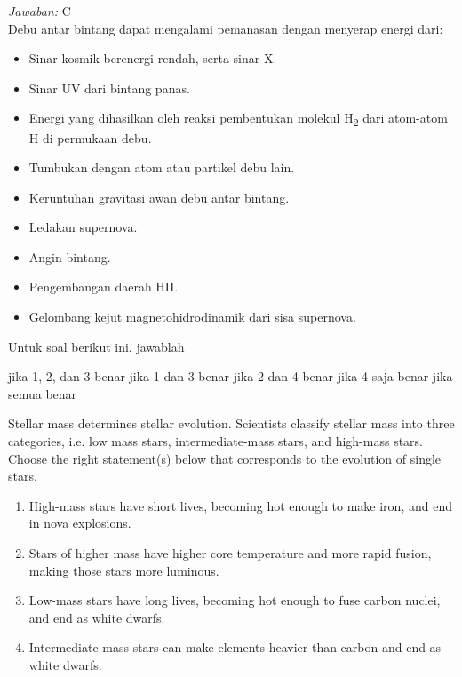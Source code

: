 \documentclass[11pt,fleqn]{exam}
\begin{document}
\begin{questions}
\textit{Jawaban: }C\\
Debu antar bintang dapat mengalami pemanasan dengan menyerap energi dari:
\begin{itemize}
\item Sinar kosmik berenergi rendah, serta sinar X.
\item Sinar UV dari bintang panas.
\item Energi yang dihasilkan oleh reaksi pembentukan molekul H\textsubscript{2} dari atom-atom H di permukaan debu.
\item Tumbukan dengan atom atau partikel debu lain.
\item Keruntuhan gravitasi awan debu antar bintang.
\item Ledakan supernova.
\item Angin bintang.
\item Pengembangan daerah HII.
\item Gelombang kejut magnetohidrodinamik dari sisa supernova.
\end{itemize}

Untuk soal berikut ini, jawablah
\begin{choices}
\choice jika 1, 2, dan 3 benar
\choice jika 1 dan 3 benar
\choice jika 2 dan 4 benar
\choice jika 4 saja benar
\choice jika semua benar
\end{choices}

\question Stellar mass determines stellar evolution. Scientists classify stellar mass into three categories, i.e. low mass stars, intermediate-mass stars, and high-mass stars. Choose the right statement(s) below that corresponds to the evolution of single stars.
\begin{enumerate}
\item High-mass stars have short lives, becoming hot enough to make iron, and end in nova explosions.
\item Stars of higher mass have higher core temperature and more rapid fusion, making those stars more luminous.
\item Low-mass stars have long lives, becoming hot enough to fuse carbon nuclei, and end as white dwarfs.
\item Intermediate-mass stars can make elements heavier than carbon and end as white dwarfs.
\end{enumerate}


\end{questions}
\end{document}
